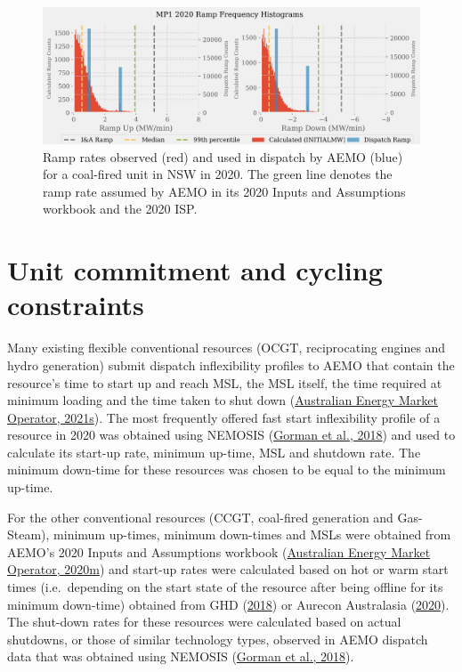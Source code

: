 \documentclass[12pt,a4paper,]{report}
\begin{document}
\begin{figure}
\hypertarget{fig:ramp_rate_comparison}{%
\centering
\includegraphics{source/figures/coal_market_upper_ramps.png}
\caption[Observed, submitted and ISP ramp rates for a NSW coal-fired
unit]{Ramp rates observed (red) and used in dispatch by AEMO (blue) for
a coal-fired unit in NSW in 2020. The green line denotes the ramp rate
assumed by AEMO in its 2020 Inputs and Assumptions workbook and the 2020
ISP.}\label{fig:ramp_rate_comparison}
}
\end{figure}

\hypertarget{unit-commitment-and-cycling-constraints}{%
\section{Unit commitment and cycling
constraints}\label{unit-commitment-and-cycling-constraints}}

Many existing flexible conventional resources (OCGT, reciprocating
engines and hydro generation) submit dispatch inflexibility profiles to
AEMO that contain the resource's time to start up and reach MSL, the MSL
itself, the time required at minimum loading and the time taken to shut
down
(\protect\hyperlink{ref-australianenergymarketoperatorFastStartInflexibilityProfile2021}{Australian
Energy Market Operator, 2021s}). The most frequently offered fast start
inflexibility profile of a resource in 2020 was obtained using NEMOSIS
(\protect\hyperlink{ref-gormanNEMOSISNEMOpen2018}{Gorman et al., 2018})
and used to calculate its start-up rate, minimum up-time, MSL and
shutdown rate. The minimum down-time for these resources was chosen to
be equal to the minimum up-time.

For the other conventional resources (CCGT, coal-fired generation and
Gas-Steam), minimum up-times, minimum down-times and MSLs were obtained
from AEMO's 2020 Inputs and Assumptions workbook
(\protect\hyperlink{ref-australianenergymarketoperator2020InputsAssumptions2020}{Australian
Energy Market Operator, 2020m}) and start-up rates were calculated based
on hot or warm start times (i.e.~depending on the start state of the
resource after being offline for its minimum down-time) obtained from
GHD (\protect\hyperlink{ref-ghd2018AEMOCost2018}{2018}) or Aurecon
Australasia
(\protect\hyperlink{ref-aureconaustralasiaGeneratorTechnicalCost2020}{2020}).
The shut-down rates for these resources were calculated based on actual
shutdowns, or those of similar technology types, observed in AEMO
dispatch data that was obtained using NEMOSIS
(\protect\hyperlink{ref-gormanNEMOSISNEMOpen2018}{Gorman et al., 2018}).
\end{document}
